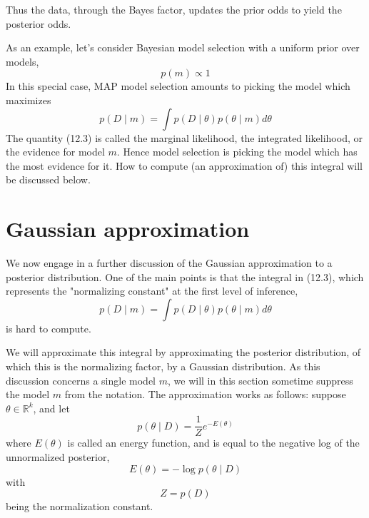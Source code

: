 \documentclass[11pt]{article}
\theoremstyle{plain} %
\theoremstyle{remark}
\begin{document}
Thus the data, through the Bayes factor, updates the prior odds to yield
  the posterior odds.


  As an example, let's consider Bayesian model selection with a uniform
  prior over models,
$$
p(m) \propto 1
$$
In this special case, MAP model selection amounts to picking the model
  which maximizes
$$
p(D \mid m)=\int p(D \mid \theta) p(\theta \mid m) d \theta
$$
The quantity (12.3) is called the marginal likelihood, the integrated
  likelihood, or the evidence for model $m$. Hence model selection is picking the model which has the most evidence
  for it. How to compute (an approximation of) this integral will be discussed
  below.

\section{Gaussian approximation}
 We now engage in a further discussion of the Gaussian approximation to a
  posterior distribution.  One of the main points is that the integral in (12.3), which represents
  the "normalizing constant" at the first level of inference, 
$$
p(D \mid m)=\int p(D \mid \theta) p(\theta \mid m) d \theta
$$
is hard to compute.

 We will approximate this integral by approximating the posterior
  distribution, of which this is the normalizing factor, by a Gaussian
  distribution. As this discussion concerns a single model $m$, we will in this section
  sometime suppress the model $m$ from the notation. The approximation works as follows: suppose $\theta \in \mathbb{R}^{k}$,
  and let 
$$
p(\theta \mid D)=\frac{1}{Z} e^{-E(\theta)}
$$
where $E(\theta)$ is called an energy function, and is equal to the negative log
of the unnormalized posterior,
$$
E(\theta)=-\log p(\theta \mid D)
$$
with
$$
Z=p(D)
$$
being the normalization constant.
\end{document}
